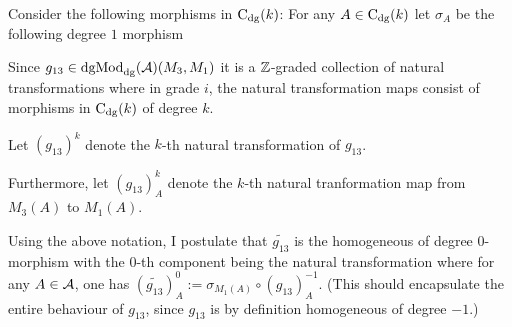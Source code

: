 \documentclass[a4paper, 12pt]{article}
\begin{document}
Consider the following morphisms in \( \operatorname{C}_{\operatorname{dg}}(k) \): For any \( A \in \operatorname{C}_{\operatorname{dg}}(k) \) let \( \sigma_A \) be the following degree \( 1 \) morphism
\begin{center}
    \newcommand{\height}{2cm}
\end{center}

Since \( g_{13} \in \operatorname{dgMod}_{\operatorname{dg}}({\mathcal{A}})(M_3, M_1) \) it is a \( {\mathbb{Z}} \)-graded collection of natural transformations where in grade \( i \), the natural transformation maps consist of morphisms in \( \operatorname{C}_{\operatorname{dg}}(k) \) of degree \( k \).

Let \( (g_{13})^k \) denote the \( k \)-th natural transformation of \( g_{13} \).

Furthermore, let \( (g_{13})^k_A \) denote the \( k \)-th natural tranformation map from \( M_3(A) \) to \( M_1(A) \).

Using the above notation, I postulate that \( \widetilde{g_{13}} \) is the homogeneous of degree \( 0 \)-morphism with the \( 0 \)-th component being the natural transformation where for any \( A \in {\mathcal{A}} \), one has \( (\widetilde{g_{13}})_A^0 := \sigma_{M_1(A)} \circ (g_{13})^{-1}_A \). (This should encapsulate the entire behaviour of \( g_{13} \), since \( g_{13} \) is by definition homogeneous of degree \( -1 \).)
\end{document}
